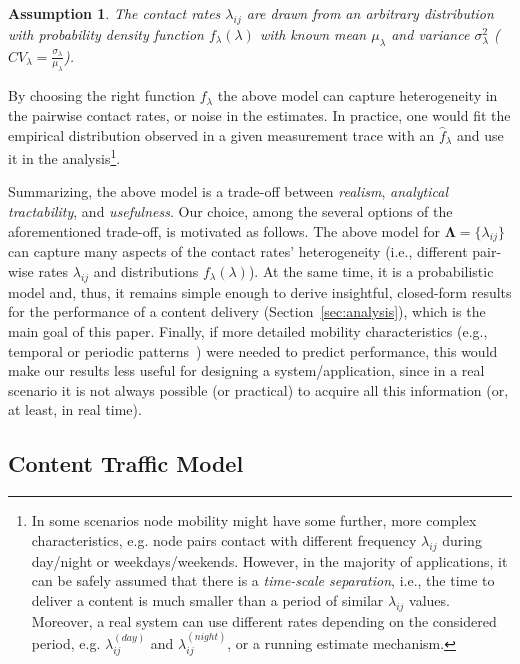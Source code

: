 \documentclass[journal]{IEEEtran}
\newtheorem{assumption}{Assumption}
\newcommand{\revisionRed}[1]{{#1}}\newcommand{\red}[1]{{#1}}
\begin{document}
\begin{assumption}\label{ass:heterogeneous-mobility}
 The contact rates $\lambda_{ij}$ are drawn from an arbitrary distribution with probability density function $f_{\lambda}(\lambda)$ with known mean $\mu_{\lambda}$ and variance $\sigma^{2}_{\lambda}$ ($CV_{\lambda} = \frac{\sigma_{\lambda}}{\mu_{\lambda}}$).
\end{assumption}

By choosing the right function $f_{\lambda}$ the above model can capture heterogeneity in the pairwise contact rates, or noise in the estimates. In practice, one would fit the empirical distribution observed in a given measurement trace with an $\hat{f}_{\lambda}$ and use it in the analysis\footnote{\red{In some scenarios node mobility might have some further, more complex characteristics, e.g. node pairs contact with different frequency $\lambda_{ij}$ during day/night or weekdays/weekends. However, in the majority of applications, it can be safely assumed that there is a \textit{time-scale separation}, i.e., the time to deliver a content is much smaller than a period of similar $\lambda_{ij}$ values. Moreover, a real system can use different rates depending on the considered period, e.g. $\lambda_{ij}^{(day)}$ and $\lambda_{ij}^{(night)}$, or a running estimate mechanism.}}.


\revisionRed{Summarizing, the above model is a trade-off between \textit{realism}, \textit{analytical tractability}, and \textit{usefulness}. Our choice, among the several options of the aforementioned trade-off, is motivated as follows. The above model for  $\mathbf{\Lambda} = \lbrace\lambda_{ij}\rbrace$ can capture many aspects of the contact rates' heterogeneity (i.e., different pair-wise rates $\lambda_{ij}$ and distributions $f_{\lambda}(\lambda)$). At the same time, it is a probabilistic model and, thus, it remains simple enough to derive insightful, closed-form results for the performance of a content delivery (Section~\ref{sec:analysis}), which is the main goal of this paper. Finally, if more detailed mobility characteristics (e.g., temporal or periodic patterns~\cite{transient-contact-patterns}) were needed to predict performance, this would make our results less useful for designing a system/application, since in a real scenario it is not always possible (or practical) to acquire all this information (or, at least, in real time).}






\subsection{Content Traffic Model}\label{sec:content-traffic-model}
\end{document}
